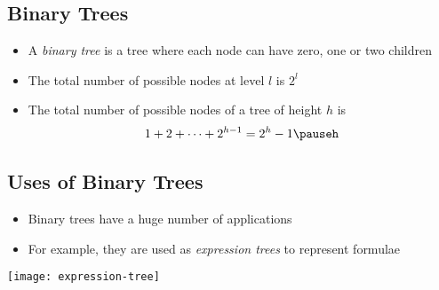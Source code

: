 \begin{slide}
\section[-2]{Binary Trees}

\pausebuild
\color{TwoColor}
\begin{itemize}\squeeze
\item A \emph{binary tree} is a tree where each node can have zero,
  one or two children\pauseh
\item The total number of possible nodes at level $l$ is $2^l$\pauseh
\item The total number of possible nodes of a tree of height $h$ is
  \begin{align*}
    1 + 2 + \cdots + 2^{h-1} = 2^{h} -1 \pauseh
  \end{align*}\vspace{-1cm}
\end{itemize}
\begin{center}
  \pause    
\end{center}\vspace{-1cm}
\end{slide}



\begin{slide}
\section[-1]{Uses of Binary Trees}

\begin{PauseHighLight}
  \begin{itemize}
  \item Binary trees have a huge number of applications\pause
  \item For example, they are used as \emph{expression trees} to
    represent formulae
  \end{itemize}
  \begin{center}
    \texttt{[image: expression-tree]} \pause
  \end{center}
\end{PauseHighLight}

\end{slide}





